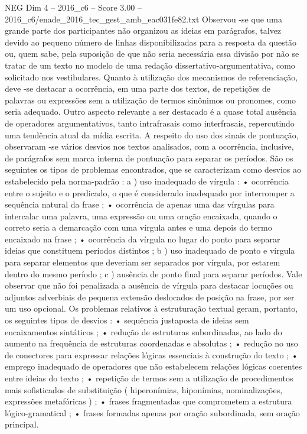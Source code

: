 \begin{textsample}{NEG Dim 4 – 2016\_c6 – Score 3.00 – 2016\_c6/enade\_2016\_tec\_gest\_amb\_eac031fe82.txt}
Observou -se que uma grande parte dos participantes não organizou as ideias em parágrafos, talvez devido ao pequeno número de linhas disponibilizadas para a resposta da questão ou, quem sabe, pela suposição de que não seria necessária essa divisão por não se tratar de um texto no modelo de uma redação dissertativo-argumentativa, como solicitado nos vestibulares.
Quanto à utilização dos mecanismos de referenciação, deve -se destacar a ocorrência, em uma parte dos textos, de repetições de palavras ou expressões sem a utilização de termos sinônimos ou pronomes, como seria adequado.
Outro aspecto relevante a ser destacado é a quase total ausência de operadores argumentativos, tanto intrafrasais como interfrasais, repercutindo uma tendência atual da mídia escrita.
A respeito do uso dos sinais de pontuação, observaram -se vários desvios nos textos analisados, com a ocorrência, inclusive, de parágrafos sem marca interna de pontuação para separar os períodos.
São os seguintes os tipos de problemas encontrados, que se caracterizam como desvios ao estabelecido pela norma-padrão : a ) uso inadequado de vírgula : • ocorrência entre o sujeito e o predicado, o que é considerado inadequado por interromper a sequência natural da frase ; • ocorrência de apenas uma das vírgulas para intercalar uma palavra, uma expressão ou uma oração encaixada, quando o correto seria a demarcação com uma vírgula antes e uma depois do termo encaixado na frase ; • ocorrência da vírgula no lugar do ponto para separar ideias que constituem períodos distintos ; b ) uso inadequado de ponto e vírgula para separar elementos que deveriam ser separados por vírgula, por estarem dentro do mesmo período ; c ) ausência de ponto final para separar períodos.
Vale observar que não foi penalizada a ausência de vírgula para destacar locuções ou adjuntos adverbiais de pequena extensão deslocados de posição na frase, por ser um uso opcional.
Os problemas relativos à estruturação textual geram, portanto, os seguintes tipos de desvios : • sequência justaposta de ideias sem encaixamentos sintáticos ; • redução de estruturas subordinadas, ao lado do aumento na frequência de estruturas coordenadas e absolutas ; • redução no uso de conectores para expressar relações lógicas essenciais à construção do texto ; • emprego inadequado de operadores que não estabelecem relações lógicas coerentes entre ideias do texto ; • repetição de termos sem a utilização de procedimentos mais sofisticados de substituição ( hiperonímias, hiponímias, nominalizações, expressões metafóricas ) ; • frases fragmentadas que comprometem a estrutura lógico-gramatical ; • frases formadas apenas por oração subordinada, sem oração principal.

\end{textsample}
